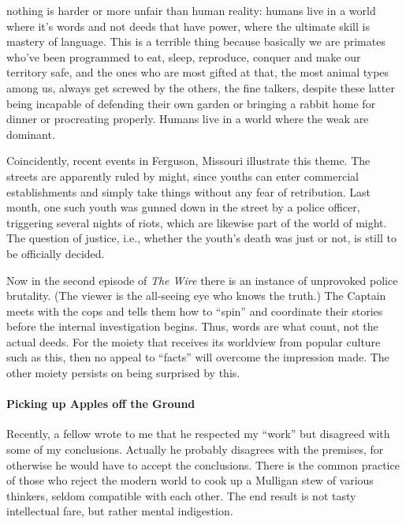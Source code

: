 \begin{quotex}
nothing is harder or more unfair than human reality: humans live in a world where it's words and not deeds that have power, where the ultimate skill is mastery of language. This is a terrible thing because basically we are primates who've been programmed to eat, sleep, reproduce, conquer and make our territory safe, and the ones who are most gifted at that, the most animal types among us, always get screwed by the others, the fine talkers, despite these latter being incapable of defending their own garden or bringing a rabbit home for dinner or procreating properly. Humans live in a world where the weak are dominant.
\end{quotex}


Coincidently, recent events in Ferguson, Missouri illustrate this theme. The streets are apparently ruled by might, since youths can enter commercial establishments and simply take things without any fear of retribution. Last month, one such youth was gunned down in the street by a police officer, triggering several nights of riots, which are likewise part of the world of might. The question of justice, i.e., whether the youth's death was just or not, is still to be officially decided.

Now in the second episode of \emph{The Wire} there is an instance of unprovoked police brutality. (The viewer is the all-seeing eye who knows the truth.) The Captain meets with the cops and tells them how to ``spin'' and coordinate their stories before the internal investigation begins. Thus, words are what count, not the actual deeds. For the moiety that receives its worldview from popular culture such as this, then no appeal to ``facts'' will overcome the impression made. The other moiety persists on being surprised by this.

\paragraph{Picking up Apples off the Ground}


Recently, a fellow wrote to me that he respected my ``work'' but disagreed with some of my conclusions. Actually he probably disagrees with the premises, for otherwise he would have to accept the conclusions. There is the common practice of those who reject the modern world to cook up a Mulligan stew of various thinkers, seldom compatible with each other. The end result is not tasty intellectual fare, but rather mental indigestion.

